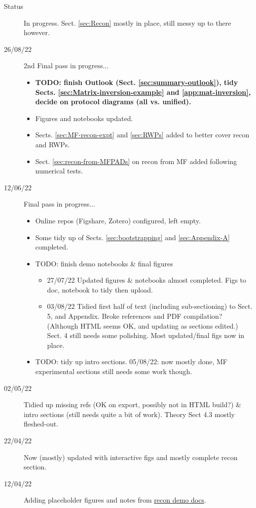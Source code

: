 \documentclass[10pt]{article}
\begin{document}
\begin{description}
\item [{Status}] In progress. Sect. \ref{sec:Recon} mostly in place, still messy up to there however.
\item [{26/08/22}] 2nd Final pass in progress...
\begin{itemize}
\item \textbf{TODO: finish Outlook (Sect. \ref{sec:summary-outlook}), tidy Sects. \ref{sec:Matrix-inversion-example} and \ref{app:mat-inversion}, decide on protocol diagrams (all vs. unified).}
\item Figures and notebooks updated.
\item Sects. \ref{sec:MF-recon-expt} and \ref{sec:RWPs} added to better cover recon and RWPs.
\item Sect. \ref{sec:recon-from-MFPADs} on recon from MF added following numerical tests.
\end{itemize}
\item [{12/06/22}] Final pass in progress...
\begin{itemize}
\item Online repos (Figshare, Zotero) configured, left empty.
\item Some tidy up of Sects. \ref{sec:bootstrapping} and \ref{sec:Appendix-A} completed.
\item TODO: finish demo notebooks \& final figures
\begin{itemize}
\item 27/07/22 Updated figures \& notebooks almost completed. Figs to doc, notebook to tidy then upload.
\item 03/08/22 Tidied first half of text (including sub-sectioning) to Sect. 5, and Appendix. Broke references and PDF compilation? (Although HTML seems OK, and updating as sections edited.) Sect. 4 still needs some polishing. Most updated/final figs now in place.
\end{itemize}
\item TODO: tidy up intro sections. 05/08/22: now mostly done, MF experimental sections still needs some work though.
\end{itemize}
\item [{02/05/22}] Tidied up missing refs (OK on export, possibly not in HTML build?) \& intro sections (still needs quite a bit of work). Theory Sect 4.3 mostly fleshed-out.
\item [{22/04/22}] Now (mostly) updated with interactive figs and mostly complete recon section.
\item [{12/04/22}] Adding placeholder figures and notes from \href{https://pemtk.readthedocs.io/en/latest/fitting/PEMtk_analysis_demo_150621-tidy.html}{recon demo docs}.

\end{description}
\end{document}
